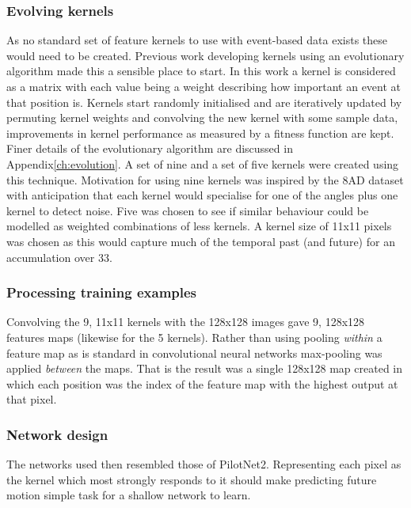 \subsubsection{Evolving kernels}
As no standard set of feature kernels to use with event-based data exists these would need to be created.
Previous work developing kernels using an evolutionary algorithm made this a sensible place to start.
In this work a kernel is considered as a matrix with each value being a weight describing how important an event at that position is.
Kernels start randomly initialised and are iteratively updated by permuting kernel weights and convolving the new kernel with some sample data, improvements in kernel performance as measured by a fitness function are kept.
Finer details of the evolutionary algorithm are discussed in Appendix\ref{ch:evolution}.
A set of nine and a set of five kernels were created using this technique.
Motivation for using nine kernels was inspired by the 8AD dataset with anticipation that each kernel would specialise for one of the angles plus one kernel to detect noise.
Five was chosen to see if similar behaviour could be modelled as weighted combinations of less kernels.
A kernel size of 11x11 pixels was chosen as this would capture much of the temporal past (and future) for an accumulation over 33\ms.



\subsubsection{Processing training examples}
Convolving the 9, 11x11 kernels with the 128x128 images gave 9, 128x128 features maps (likewise for the 5 kernels).
Rather than using pooling \textit{within} a feature map as is standard in convolutional neural networks max-pooling was applied \textit{between} the maps. 
That is the result was a single 128x128 map created in which each position was the index of the feature map with the highest output at that pixel.




\subsubsection{Network design} 
The networks used then resembled those of PilotNet2.
Representing each pixel as the kernel which most strongly responds to it should make predicting future motion simple task for a shallow network to learn.

